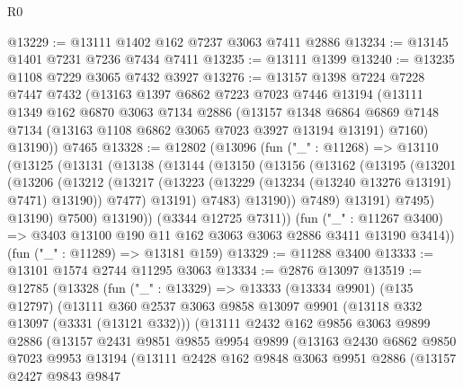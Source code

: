\begin{lexlean}{R0}
\begin{coremodule}
@13229 := @13111 @1402 @162 @7237 @3063 @7411 @2886
@13234 := @13145 @1401 @7231 @7236 @7434 @7411
@13235 := @13111 @1399
@13240 := @13235 @1108 @7229 @3065 @7432 @3927
@13276 := @13157
    @1398
    @7224
    @7228
    @7447
    @7432
    (@13163
      @1397
      @6862
      @7223
      @7023
      @7446
      @13194
      (@13111
        @1349
        @162
        @6870
        @3063
        @7134
        @2886
        (@13157
          @1348
          @6864
          @6869
          @7148
          @7134
          (@13163 @1108 @6862 @3065 @7023 @3927 @13194 @13191)
          @7160)
        @13190))
    @7465
@13328 := @12802
    (@13096
      (fun ("_" : @11268) =>
      @13110
        (@13125
          (@13131
            (@13138
              (@13144
                (@13150
                  (@13156
                    (@13162
                      (@13195
                        (@13201
                          (@13206
                            (@13212
                              (@13217
                                (@13223 (@13229 (@13234 (@13240 @13276 @13191) @7471) @13190))
                                @7477)
                              @13191)
                            @7483)
                          @13190))
                      @7489)
                    @13191)
                  @7495)
                @13190)
              @7500)
            @13190))
        (@3344 @12725 @7311))
      (fun ("_" : @11267 @3400) => @3403 @13100 @190 @11 @162 @3063 @3063 @2886 @3411 @13190 @3414))
    (fun ("_" : @11289) => @13181 @159)
@13329 := @11288 @3400
@13333 := @13101 @1574 @2744 @11295 @3063
@13334 := @2876 @13097
@13519 := @12785
    (@13328
      (fun ("_" : @13329) =>
      @13333
        (@13334 @9901)
        (@135 @12797)
        (@13111
          @360
          @2537
          @3063
          @9858
          @13097
          @9901
          (@13118 @332 @13097 (@3331 (@13121 @332)))
          (@13111
            @2432
            @162
            @9856
            @3063
            @9899
            @2886
            (@13157
              @2431
              @9851
              @9855
              @9954
              @9899
              (@13163
                @2430
                @6862
                @9850
                @7023
                @9953
                @13194
                (@13111
                  @2428
                  @162
                  @9848
                  @3063
                  @9951
                  @2886
                  (@13157
                    @2427
                    @9843
                    @9847

\end{coremodule}
\end{lexlean}
